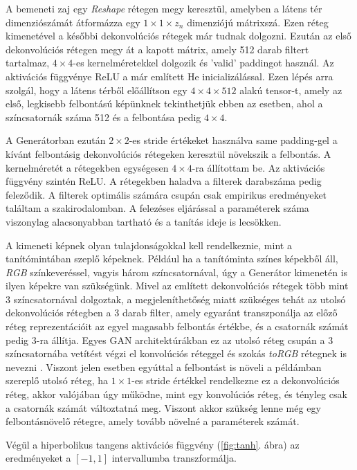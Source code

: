A bemeneti zaj egy \textit{Reshape} rétegen megy keresztül, amelyben a látens tér dimenziószámát átformázza egy $1 \times 1 \times z_n$ dimenziójú mátrixszá. Ezen réteg kimenetével a későbbi dekonvolúciós rétegek már tudnak dolgozni.
Ezután az első dekonvolúciós rétegen megy át a kapott mátrix, amely 512 darab filtert tartalmaz, $4 \times 4$-es kernelméretekkel dolgozik és 'valid' paddingot használ. Az aktivációs függvénye ReLU a már említett He inicializálással. Ezen lépés arra szolgál, hogy a látens térből előállítson egy $4 \times 4 \times 512$ alakú tensor-t, amely az első, legkisebb felbontású képünknek tekinthetjük ebben az esetben, ahol a színcsatornák száma 512 és a felbontása pedig $4 \times 4$.

A Generátorban ezután $2 \times 2$-es stride értékeket használva same padding-gel a kívánt felbontásig dekonvolúciós rétegeken keresztül növekszik a felbontás. A kernelméretét a rétegekben egységesen $4 \times 4$-ra állítottam be. Az aktivációs függvény szintén ReLU. A rétegekben haladva a filterek darabszáma pedig feleződik. A filterek optimális számára csupán csak empirikus eredményeket találtam a szakirodalomban. A felezéses eljárással a paraméterek száma viszonylag alacsonyabban tartható és a tanítás ideje is lecsökken.

A kimeneti képnek olyan tulajdonságokkal kell rendelkeznie, mint a tanítómintában szeplő képeknek. Például ha a tanítóminta színes képekből áll, \textit{RGB} színkeveréssel, vagyis három színcsatornával, úgy a Generátor kimenetén is ilyen képekre van szükségünk. Mivel az említett dekonvolúciós rétegek több mint 3 színcsatornával dolgoztak, a megjeleníthetőség miatt szükséges tehát az utolsó dekonvolúciós rétegben a 3 darab filter, amely egyaránt transzponálja az előző réteg reprezentációit az egyel magasabb felbontás értékbe, és a csatornák számát pedig 3-ra állítja.
Egyes GAN architektúrákban ez az utolsó réteg csupán a 3 színcsatornába vetítést végzi el konvolúciós réteggel és szokás \textit{toRGB} rétegnek is nevezni \cite{karras2017progressive, karras2019style, karnewar2020msg}. Viszont jelen esetben egyúttal a felbontást is növeli a példámban szereplő utolsó réteg, ha $1 \times 1$-es stride értékkel rendelkezne ez a dekonvolúciós réteg, akkor valójában úgy működne, mint egy konvolúciós réteg, és tényleg csak a csatornák számát változtatná meg. Viszont akkor szükség lenne még egy felbontásnövelő rétegre, amely tovább növelné a paraméterek számát.

Végül a hiperbolikus tangens aktivációs függvény (\ref{fig:tanh}. ábra) az eredményeket a $[-1, 1]$ intervallumba transzformálja.


